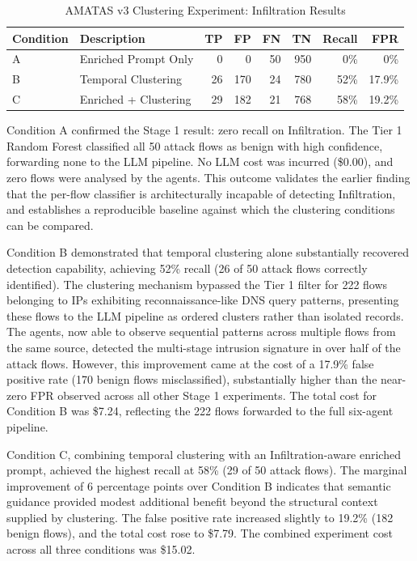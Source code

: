 \documentclass[../main.tex]{subfiles}
\begin{document}
\begin{table}[H]
\centering
\caption{AMATAS v3 Clustering Experiment: Infiltration Results}
\label{tab:v3-clustering}
\begin{tabularx}{\textwidth}{l l r r r r r r}
\toprule
Condition & Description & TP & FP & FN & TN & Recall & FPR \\
\midrule
A & Enriched Prompt Only    & 0  & 0   & 50 & 950 & 0\%  & 0\% \\
B & Temporal Clustering     & 26 & 170 & 24 & 780 & 52\% & 17.9\% \\
C & Enriched + Clustering   & 29 & 182 & 21 & 768 & 58\% & 19.2\% \\
\bottomrule
\end{tabularx}
\end{table}

Condition A confirmed the Stage 1 result: zero recall on Infiltration. The Tier 1 Random Forest classified all 50 attack flows as benign with high confidence, forwarding none to the LLM pipeline. No LLM cost was incurred (\$0.00), and zero flows were analysed by the agents. This outcome validates the earlier finding that the per-flow classifier is architecturally incapable of detecting Infiltration, and establishes a reproducible baseline against which the clustering conditions can be compared.

Condition B demonstrated that temporal clustering alone substantially recovered detection capability, achieving 52\% recall (26 of 50 attack flows correctly identified). The clustering mechanism bypassed the Tier 1 filter for 222 flows belonging to IPs exhibiting reconnaissance-like DNS query patterns, presenting these flows to the LLM pipeline as ordered clusters rather than isolated records. The agents, now able to observe sequential patterns across multiple flows from the same source, detected the multi-stage intrusion signature in over half of the attack flows. However, this improvement came at the cost of a 17.9\% false positive rate (170 benign flows misclassified), substantially higher than the near-zero FPR observed across all other Stage 1 experiments. The total cost for Condition B was \$7.24, reflecting the 222 flows forwarded to the full six-agent pipeline.

Condition C, combining temporal clustering with an Infiltration-aware enriched prompt, achieved the highest recall at 58\% (29 of 50 attack flows). The marginal improvement of 6 percentage points over Condition B indicates that semantic guidance provided modest additional benefit beyond the structural context supplied by clustering. The false positive rate increased slightly to 19.2\% (182 benign flows), and the total cost rose to \$7.79. The combined experiment cost across all three conditions was \$15.02.
\end{document}
